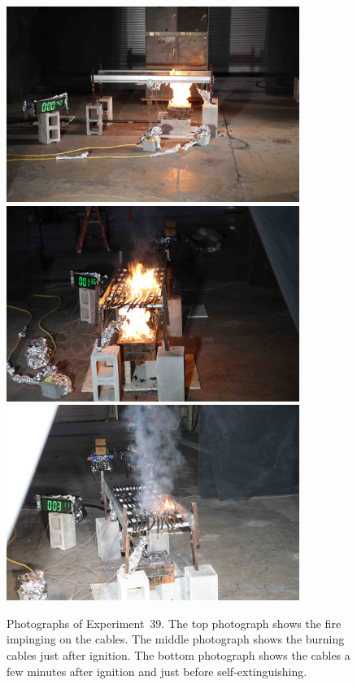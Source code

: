 \begin{figure}[p]
\centering
\includegraphics[height=2.50in]{../FIGURES/Test_39_side} \\
\includegraphics[height=2.50in]{../FIGURES/Test_39_1_min_36_s} \\
\includegraphics[height=2.50in]{../FIGURES/Test_39_3_min_11_s}
\caption[Photographs of Experiment~39]{Photographs of Experiment~39. The top photograph shows the fire impinging on the cables. The middle photograph shows the burning cables just after ignition. The bottom photograph shows the cables a few minutes after ignition and just before self-extinguishing.}
\label{fig:Test_39_photos}
\end{figure}


